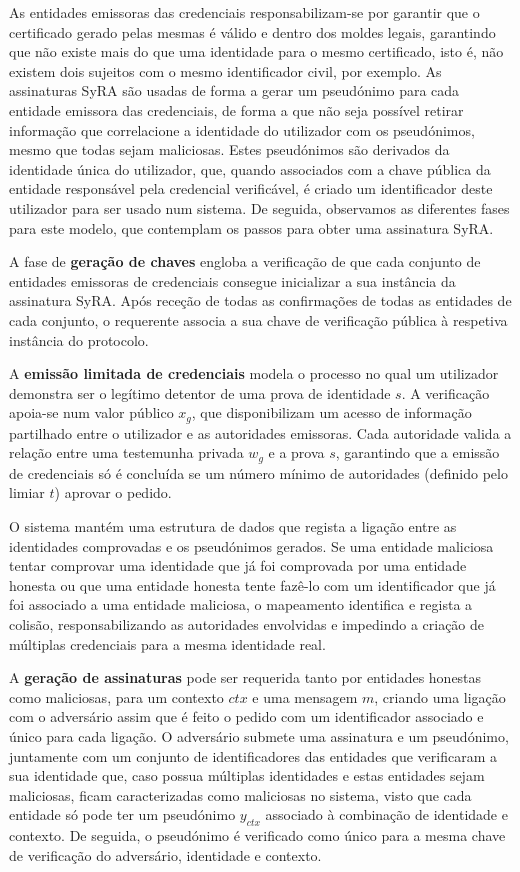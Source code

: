As entidades emissoras das credenciais responsabilizam-se por garantir que o certificado gerado pelas mesmas é válido e dentro dos moldes legais, garantindo que não existe mais do que uma identidade para o mesmo certificado, isto é, não existem dois sujeitos com o mesmo identificador civil, por exemplo. As assinaturas SyRA são usadas de forma a gerar um pseudónimo para cada entidade emissora das credenciais, de forma a que não seja possível retirar informação que correlacione a identidade do utilizador com os pseudónimos, mesmo que todas sejam maliciosas. Estes pseudónimos são derivados da identidade única do utilizador, que, quando associados com a chave pública da entidade responsável pela credencial verificável, é criado um identificador deste utilizador para ser usado num sistema. De seguida, observamos as diferentes fases para este modelo, que contemplam os passos para obter uma assinatura SyRA.

A fase de \textbf{geração de chaves} engloba a verificação de que cada conjunto de entidades emissoras de credenciais consegue inicializar a sua instância da assinatura SyRA. Após receção de todas as confirmações de todas as entidades de cada conjunto, o requerente associa a sua chave de verificação pública à respetiva instância do protocolo.

A \textbf{emissão limitada de credenciais} modela o processo no qual um utilizador demonstra ser o legítimo detentor de uma prova de identidade $s$. A verificação apoia-se num valor público $x_g$, que disponibilizam um acesso de informação partilhado entre o utilizador e as autoridades emissoras. Cada autoridade valida a relação entre uma testemunha privada $w_g$ e a prova $s$, garantindo que a emissão de credenciais só é concluída se um número mínimo de autoridades (definido pelo limiar $t$) aprovar o pedido.

O sistema mantém uma estrutura de dados que regista a ligação entre as identidades comprovadas e os pseudónimos gerados. Se uma entidade maliciosa tentar comprovar uma identidade que já foi comprovada por uma entidade honesta ou que uma entidade honesta tente fazê-lo com um identificador que já foi associado a uma entidade maliciosa, o mapeamento identifica e regista a colisão, responsabilizando as autoridades envolvidas e impedindo a criação de múltiplas credenciais para a mesma identidade real.

A \textbf{geração de assinaturas} pode ser requerida tanto por entidades honestas como maliciosas, para um contexto $ctx$ e uma mensagem $m$, criando uma ligação com o adversário assim que é feito o pedido com um identificador associado e único para cada ligação. O adversário submete uma assinatura e um pseudónimo, juntamente com um conjunto de identificadores das entidades que verificaram a sua identidade que, caso possua múltiplas identidades e estas entidades sejam maliciosas, ficam caracterizadas como maliciosas no sistema, visto que cada entidade só pode ter um pseudónimo $y_{ctx}$ associado à combinação de identidade e contexto. De seguida, o pseudónimo é verificado como único para a mesma chave de verificação do adversário, identidade e contexto.

